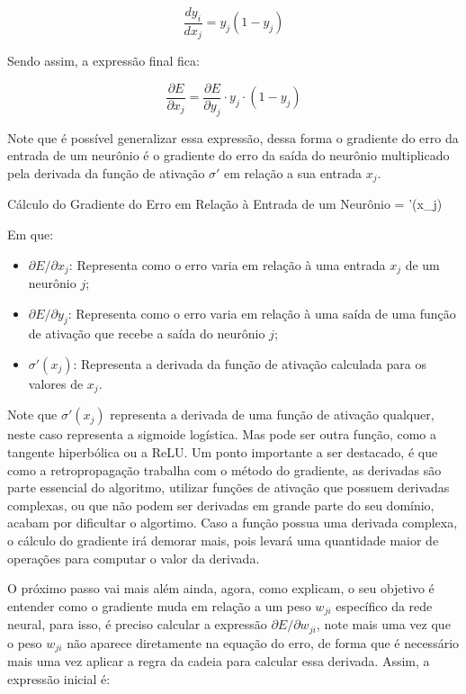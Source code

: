 \[
    \frac{d y_i}{d x_j} = y_j (1 - y_j)
\]

Sendo assim, a expressão final fica:

\begin{equation}
     \frac{\partial E}{\partial x_j} = \frac{\partial E}{\partial y_j} \cdot y_j \cdot (1 - y_j)
     \label{eq:gradiento-do-erro-em-relacao-a-entrada-de-um-neuronio-para-a-mse-e-sigmoide}
\end{equation}

Note que é possível generalizar essa expressão, dessa forma o gradiente do erro da entrada de um neurônio é o gradiente do erro da saída do neurônio multiplicado pela derivada da função de ativação $\sigma'$ em relação a sua entrada $x_j$.

\begin{equacaodestaque}{Cálculo do Gradiente do Erro em Relação à Entrada de um Neurônio}
     =  \cdot \sigma'(x_j)
    \label{eq:gradiente-do-erro-em-relacao-a-entrada-de-um-neuronio}
\end{equacaodestaque}

Em que:

\begin{itemize}
    \item $\partial E / \partial x_j$: Representa como o erro varia em relação à uma entrada $x_j$ de um neurônio $j$;
    \item $\partial E / \partial y_j$: Representa como o erro varia em relação à uma saída de uma função de ativação que recebe a saída do neurônio $j$;
    \item $\sigma'(x_j)$: Representa a derivada da função de ativação calculada para os valores de $x_j$.
\end{itemize}

Note que $\sigma'(x_j)$ representa a derivada de uma função de ativação qualquer, neste caso representa a sigmoide logística. Mas pode ser outra função, como a tangente hiperbólica ou a ReLU. Um ponto importante a ser destacado, é que como a retropropagação trabalha com o método do gradiente, as derivadas são parte essencial do algoritmo, utilizar funções de ativação que possuem derivadas complexas, ou que não podem ser derivadas em grande parte do seu domínio, acabam por dificultar o algortimo. Caso a função possua uma derivada complexa, o cálculo do gradiente irá demorar mais, pois levará uma quantidade maior de operações para computar o valor da derivada.

O próximo passo vai mais além ainda, agora, como \textcite{BackpropagationArticle} explicam, o seu objetivo é entender como o gradiente muda em relação a um peso $w_{ji}$ específico da rede neural, para isso, é preciso calcular a expressão $\partial E / \partial w_{ji}$, note mais uma vez que o peso $w_{ji}$ não aparece diretamente na equação do erro, de forma que é necessário mais uma vez aplicar a regra da cadeia para calcular essa derivada. Assim, a expressão inicial é:

